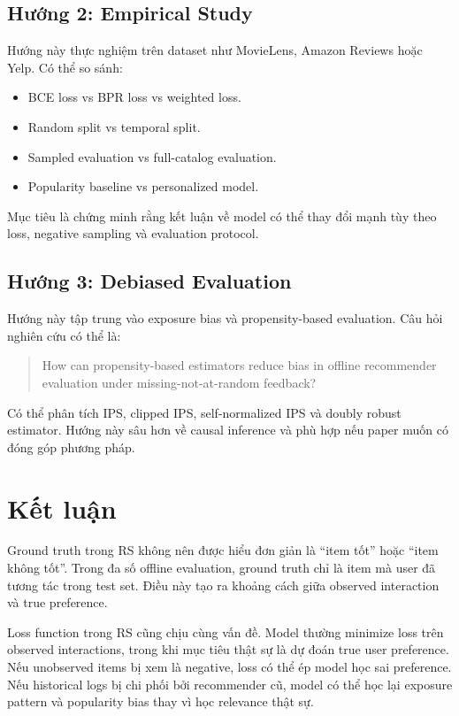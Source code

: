 \documentclass[12pt,a4paper]{article}
\begin{document}
\subsection{Hướng 2: Empirical Study}

Hướng này thực nghiệm trên dataset như MovieLens, Amazon Reviews hoặc Yelp. Có thể so sánh:

\begin{itemize}[leftmargin=*]
    \item BCE loss vs BPR loss vs weighted loss.
    \item Random split vs temporal split.
    \item Sampled evaluation vs full-catalog evaluation.
    \item Popularity baseline vs personalized model.
\end{itemize}

Mục tiêu là chứng minh rằng kết luận về model có thể thay đổi mạnh tùy theo loss, negative sampling và evaluation protocol.

\subsection{Hướng 3: Debiased Evaluation}

Hướng này tập trung vào exposure bias và propensity-based evaluation. Câu hỏi nghiên cứu có thể là:

\begin{quote}
How can propensity-based estimators reduce bias in offline recommender evaluation under missing-not-at-random feedback?
\end{quote}

Có thể phân tích IPS, clipped IPS, self-normalized IPS và doubly robust estimator. Hướng này sâu hơn về causal inference và phù hợp nếu paper muốn có đóng góp phương pháp.

\section{Kết luận}

Ground truth trong RS không nên được hiểu đơn giản là ``item tốt'' hoặc ``item không tốt''. Trong đa số offline evaluation, ground truth chỉ là item mà user đã tương tác trong test set. Điều này tạo ra khoảng cách giữa observed interaction và true preference.

Loss function trong RS cũng chịu cùng vấn đề. Model thường minimize loss trên observed interactions, trong khi mục tiêu thật sự là dự đoán true user preference. Nếu unobserved items bị xem là negative, loss có thể ép model học sai preference. Nếu historical logs bị chi phối bởi recommender cũ, model có thể học lại exposure pattern và popularity bias thay vì học relevance thật sự.
\end{document}
